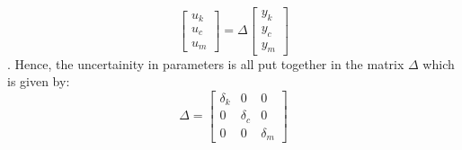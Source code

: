 \documentclass[a4paper,12pt]{article}
\begin{document}
			\[
			\begin{bmatrix}
			u_{k}\\
			u_{c}\\
			u_{m}
			\end{bmatrix}
			= \Delta
			\begin{bmatrix}
				y_{k}\\
				y_{c}\\
				y_{m}
			\end{bmatrix}
			\]. Hence, the uncertainity in parameters is all put together in the matrix $\Delta$ which is given by:
			\[
			\Delta = 
			\begin{bmatrix}
			\delta_{k} & 0 & 0\\
			0 & \delta_{c} & 0\\
			0 & 0 & \delta_{m}
			\end{bmatrix}
			\]
%				
%			
\end{document}
